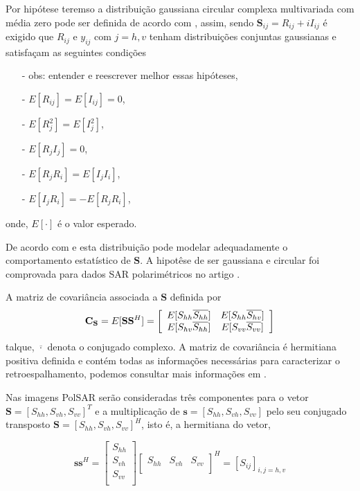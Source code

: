 \documentclass[conference]{IEEEtran}
\begin{document}
Por hipótese teremso a distribuição gaussiana circular complexa multivariada com média zero pode ser definida de acordo com \cite{good}, assim, sendo $\mathbf{S}_{ij}= R_{ij}+ i I_{ij}$ é exigido que $R_{ij}$ e $y_{ij}$ com $j=h,v$ tenham distribuições conjuntas gaussianas e satisfaçam as seguintes condições 
\begin{itemize}
    \item[-] obs: entender e reescrever melhor essas hipóteses,
	\item[-] $E[R_{ij}]=E[I_{ij}]=0$,
	\item[-] $E[R_j^2]=E[I_j^2]$,
	\item[-] $E[R_jI_j]=0$,
	\item[-] $E[R_jR_i]=E[I_jI_i]$,
	\item[-] $E[I_jR_i]=-E[R_jR_i]$,
\end{itemize}
onde, $E[\cdot]$ é o valor esperado.


De acordo com \cite{good} e \cite{lee} esta distribuição pode modelar adequadamente o comportamento estatístico de $\mathbf{S}$. A hipotêse de ser gaussiana e circular foi comprovada para dados SAR polarimétricos no artigo \cite{sarabendi}.   


A matriz de covariância associada a $\mathbf{S}$ definida por
\begin{equation}
	{\bf C_{{\bf S}}} = E[{\mathbf S}{\mathbf S}^H] = \left[
\begin{array}{cc}
	E[S_{hh}\overline{S_{hh}}]  & E[{S_{hh}}\overline{S_{hv}}]   \\
	E[S_{hv}\overline{S_{hh}}]  & E[{S_{vv}}\overline{S_{vv}}]  \\
\end{array}
\right]
\end{equation}
talque, $\overline{\cdot}$ denota o conjugado complexo. A matriz de covariância é hermitiana positiva definida e contém todas as informações necessárias para caracterizar o retroespalhamento, podemos consultar mais informações em \cite{mfp}. 

Nas imagens PolSAR serão consideradas três componentes para o vetor $\mathbf{S}=[S_{hh},S_{vh},S_{vv}]^T$ e a multiplicação de $\mathbf{s}=[S_{hh},S_{vh},S_{vv}]$ pelo seu conjugado transposto $\mathbf{S}=[S_{hh},S_{vh},S_{vv}]^H$, isto é, a hermitiana do vetor, 

\begin{equation}
\mathbf{s}\mathbf{s}^H = \left[
\begin{array}{c}
	S_{hh}      \\
        S_{vh}     \\
	S_{vv}      \\
\end{array}
\right]
\left[
\begin{array}{ccc}
	S_{hh}  & S_{vh}  & S_{vv}      \\
\end{array}
\right]^H = \left[S_{ij} \right]_{i,j=h,v}
\end{equation}
\end{document}

